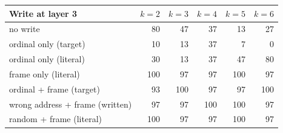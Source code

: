 \begin{tabular}{lrrrrr}
\toprule
Write at layer 3 & $k=2$ & $k=3$ & $k=4$ & $k=5$ & $k=6$ \\
\midrule
no write & 80 & 47 & 37 & 13 & 27 \\
ordinal only (target) & 10 & 13 & 37 & 7 & 0 \\
ordinal only (literal) & 30 & 13 & 37 & 47 & 80 \\
frame only (literal) & 100 & 97 & 97 & 100 & 97 \\
ordinal + frame (target) & 93 & 100 & 97 & 97 & 100 \\
wrong address + frame (written) & 97 & 97 & 100 & 100 & 97 \\
random + frame (literal) & 100 & 97 & 97 & 100 & 97 \\
\bottomrule
\end{tabular}
